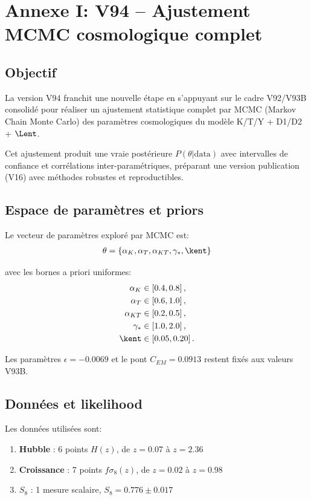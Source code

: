 \section*{Annexe I: V94 -- Ajustement MCMC cosmologique complet}

\subsection*{Objectif}

La version V94 franchit une nouvelle étape en s'appuyant sur le cadre V92/V93B consolidé pour réaliser
un ajustement statistique complet par MCMC (Markov Chain Monte Carlo) des paramètres cosmologiques
du modèle K/T/Y + D1/D2 + $\Lent$.

Cet ajustement produit une vraie postérieure $P(\theta | \text{data})$ avec intervalles de confiance et 
corrélations inter-paramétriques, préparant une version publication (V16) avec méthodes robustes et 
reproductibles.

\subsection*{Espace de paramètres et priors}

Le vecteur de paramètres exploré par MCMC est:
\begin{align}
\theta = \{ \alpha_K, \alpha_T, \alpha_{KT}, \gamma_*, \kent \}
\end{align}

avec les bornes a priori uniformes:
\begin{align}
\alpha_K &\in [0.4, 0.8] \, , \\
\alpha_T &\in [0.6, 1.0] \, , \\
\alpha_{KT} &\in [0.2, 0.5] \, , \\
\gamma_* &\in [1.0, 2.0] \, , \\
\kent &\in [0.05, 0.20] \, .
\end{align}

Les paramètres $\epsilon = -0.0069$ et le pont $C_{EM} = 0.0913$ restent fixés aux valeurs V93B.

\subsection*{Données et likelihood}

Les données utilisées sont:
\begin{enumerate}
\item \textbf{Hubble} : 6 points $H(z)$, de $z=0.07$ à $z=2.36$
\item \textbf{Croissance} : 7 points $f\sigma_8(z)$, de $z=0.02$ à $z=0.98$
\item \textbf{$S_8$} : 1 mesure scalaire, $S_8 = 0.776 \pm 0.017$
\end{enumerate}

